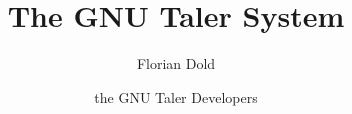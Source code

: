 \documentclass[10pt]{book}
\author{Florian Dold \and the GNU Taler Developers}
\title{The GNU Taler System}
\begin{document}
\newcommand{\astfootnote}[1]{
\let\oldthefootnote=\thefootnote%
\setcounter{footnote}{0}%
\renewcommand{\thefootnote}{\fnsymbol{footnote}}%
\footnote{#1}%
\let\thefootnote=\oldthefootnote%
}

\frontmatter


\tableofcontents
\listoffigures
\mainmatter








\printbibliography[heading=bibintoc]
\end{document}
